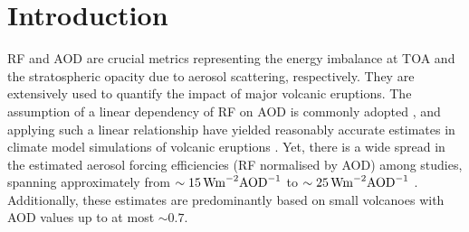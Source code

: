 \documentclass[draft]{agujournal2019}
\begin{document}
%
%


\section{Introduction}



RF and AOD are crucial metrics representing the energy imbalance at
TOA and the stratospheric opacity due to aerosol scattering, respectively. They
are extensively used to quantify the impact of major volcanic eruptions. The assumption
of a linear dependency of RF on AOD is commonly adopted
\cite{myhre2013,andersson2015}, and applying such a linear relationship have yielded
reasonably accurate estimates in climate model simulations of volcanic eruptions
\cite{mills2017,hansen2005,gregory2016,marshall2020,pitari2016b}. Yet, there is a wide
spread in the estimated aerosol forcing efficiencies (RF normalised by AOD)
among studies, spanning approximately from \(\sim
\SI{15}{\watt\metre^{-2}\ce{AOD}^{-1}}\) \cite{pitari2016b} to \(\sim
\SI{25}{\watt\metre^{-2}\ce{AOD}^{-1}}\) \cite{myhre2013}. Additionally, these
estimates are predominantly based on small volcanoes with AOD values up to at most
\(\sim 0.7\).
\end{document}
